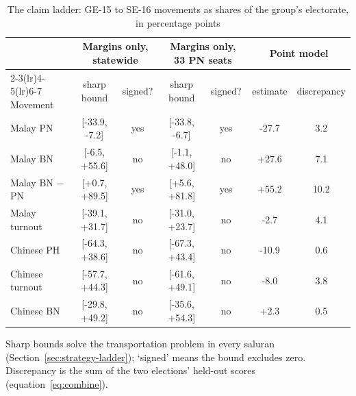 \begin{table}[!htb]
\caption{The claim ladder: GE-15 to SE-16 movements as shares of the group's electorate, in percentage points}
\label{tab:claims}
\centering
\footnotesize\setlength{\tabcolsep}{4pt}
\begin{tabular}{l cc cc cc}
\toprule
 & \multicolumn{2}{c}{Margins only, statewide} & \multicolumn{2}{c}{Margins only, 33 PN seats} & \multicolumn{2}{c}{Point model} \\
\cmidrule(lr){2-3}\cmidrule(lr){4-5}\cmidrule(lr){6-7}
Movement & sharp bound & signed? & sharp bound & signed? & estimate & discrepancy \\
\midrule
Malay PN & [-33.9, -7.2] & yes & [-33.8, -6.7] & yes & -27.7 & 3.2 \\
Malay BN & [-6.5, +55.6] & no & [-1.1, +48.0] & no & +27.6 & 7.1 \\
Malay BN $-$ PN & [+0.7, +89.5] & yes & [+5.6, +81.8] & yes & +55.2 & 10.2 \\
Malay turnout & [-39.1, +31.7] & no & [-31.0, +23.7] & no & -2.7 & 4.1 \\
Chinese PH & [-64.3, +38.6] & no & [-67.3, +43.4] & no & -10.9 & 0.6 \\
Chinese turnout & [-57.7, +44.3] & no & [-61.6, +49.1] & no & -8.0 & 3.8 \\
Chinese BN & [-29.8, +49.2] & no & [-35.6, +54.3] & no & +2.3 & 0.5 \\
\bottomrule
\end{tabular}\par\vspace{3pt}
{\footnotesize Sharp bounds solve the transportation problem in every saluran (Section~\ref{sec:strategy-ladder}); `signed' means the bound excludes zero. Discrepancy is the sum of the two elections' held-out scores (equation~\ref{eq:combine}).}
\end{table}

